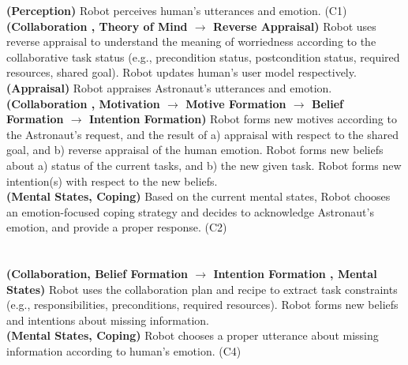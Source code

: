\noindent\textbf{(Perception)} Robot perceives human's utterances and emotion.
(C1)\\

\noindent\textbf{(Collaboration , Theory of Mind $\rightarrow$ Reverse
Appraisal)} Robot uses reverse appraisal to understand the meaning of
worriedness according to the collaborative task status (e.g., precondition
status, postcondition status, required resources, shared goal). Robot updates
human's user model respectively.\\

\noindent\textbf{(Appraisal)} Robot appraises Astronaut's utterances and
emotion.\\

\noindent\textbf{(Collaboration , Motivation $\rightarrow$ Motive Formation
$\rightarrow$ Belief Formation $\rightarrow$ Intention Formation)} Robot forms
new motives according to the Astronaut's request, and the result of a) appraisal
with respect to the shared goal, and b) reverse appraisal of the human emotion.
Robot forms new beliefs about a) status of the current tasks, and b) the new
given task. Robot forms new intention(s) with respect to the new beliefs.\\

\noindent\textbf{(Mental States, Coping)} Based on the current mental states,
Robot chooses an emotion-focused coping strategy and decides to acknowledge
Astronaut's emotion, and provide a proper response. (C2)\\

\noindent{}\\
  
\noindent{}\\

\noindent\textbf{(Collaboration, Belief Formation $\rightarrow$ Intention
Formation , Mental States)} Robot uses the collaboration plan and recipe to
extract task constraints (e.g., responsibilities, preconditions, required
resources). Robot forms new beliefs and intentions about missing information.\\

\noindent\textbf{(Mental States, Coping)} Robot chooses a proper utterance about
missing information according to human's emotion. (C4)\\

